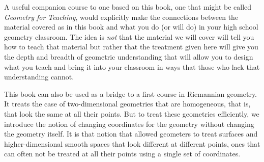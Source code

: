 \documentclass{ximera}
\begin{document}
A useful companion course to one based on this book, one that might be
called \textit{Geometry for Teaching}, would explicitly make the
connections between the material covered as in this book and what you
do (or will do) in your high school geometry classroom. The idea is
\textit{not} that the material we will cover will tell you how to
teach that material but rather that the treatment given here will give
you the depth and breadth of geometric understanding that will allow
you to design what you teach and bring it into your classroom in ways
that those who lack that understanding cannot.

\begin{remark}
This book can also be used as a bridge to a first course in Riemannian
geometry. It treats the case of two-dimensional geometries that are
homogeneous, that is, that look the same at all their points. But to treat
these geometries efficiently, we introduce the notion of changing coordinates
for the geometry without changing the geometry itself. It is that notion that
allowed geometers to treat surfaces and higher-dimensional smooth spaces that
look different at different points, ones that can often not be treated at all
their points using a single set of coordinates.
\end{remark}
\end{document}
